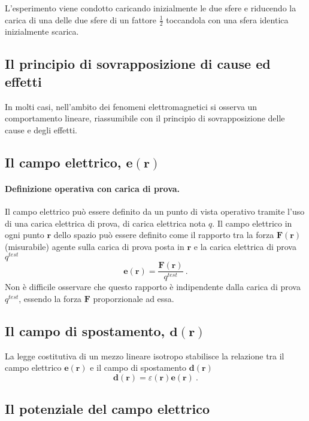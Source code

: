 \noindent
L'esperimento viene condotto caricando inizialmente le due sfere e riducendo la carica di una delle due sfere di un fattore $\frac{1}{2}$ toccandola con una sfera identica inizialmente scarica.

\subsection{Il principio di sovrapposizione di cause ed effetti}
In molti casi, nell'ambito dei fenomeni elettromagnetici si osserva un comportamento lineare, riassumibile con il principio di sovrapposizione delle cause e degli effetti.

\subsection{Il campo elettrico, $\mathbf{e}(\mathbf{r})$}
\paragraph{Definizione operativa con carica di prova.} Il campo elettrico può essere definito da un punto di vista operativo tramite l'uso di una carica elettrica di prova, di carica elettrica nota $q$. Il campo elettrico in ogni punto $\mathbf{r}$ dello spazio può essere definito come il rapporto tra la forza $\textbf{F}(\mathbf{r})$ (misurabile) agente sulla carica di prova posta in $\mathbf{r}$ e la carica elettrica di prova $q^{test}$
\begin{equation}
    \mathbf{e}(\mathbf{r}) = \dfrac{\mathbf{F}(\mathbf{r})}{q^{test}} \ .
\end{equation}
Non è difficile osservare che questo rapporto è indipendente dalla carica di prova $q^{test}$, essendo la forza $\mathbf{F}$ proporzionale ad essa.

\subsection{Il campo di spostamento, $\mathbf{d}(\mathbf{r})$}
La legge costitutiva di un mezzo lineare isotropo stabilisce la relazione tra il campo elettrico $\mathbf{e}(\mathbf{r})$ e il campo di spostamento $\mathbf{d}(\mathbf{r})$
\begin{equation}
    \mathbf{d}(\mathbf{r}) = \varepsilon(\mathbf{r}) \mathbf{e}(\mathbf{r}) \ .
\end{equation}

\subsection{Il potenziale del campo elettrico}


